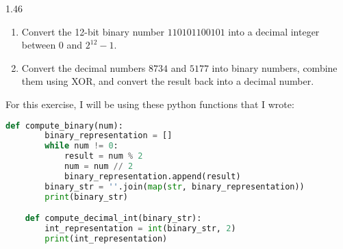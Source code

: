 
\begin{exercise}
    {1.46}
    \begin{enumerate}
        \item Convert the 12-bit binary number $110101100101$ into a decimal integer between $0$ and $2^{12} - 1$.
              \setcounter{enumi}{4}

        \item Convert the decimal numbers $8734$ and $5177$ into binary numbers, combine them using XOR, and convert the result back into a decimal number.
    \end{enumerate}
\end{exercise}

For this exercise, I will be using these python functions that I wrote: 
\begin{lstlisting}[language=python]
    def compute_binary(num):
        binary_representation = []
        while num != 0:
            result = num % 2
            num = num // 2
            binary_representation.append(result)
        binary_str = ''.join(map(str, binary_representation))
        print(binary_str)

    def compute_decimal_int(binary_str):
        int_representation = int(binary_str, 2)
        print(int_representation)
\end{lstlisting}

